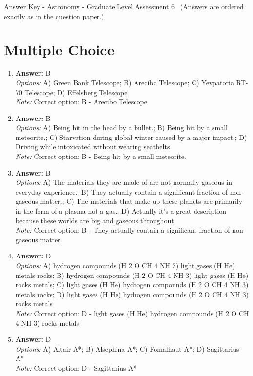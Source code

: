 \documentclass[12pt]{article}
\begin{document}
\begin{center}
Answer Key - Astronomy - Graduate Level Assessment 6 \
\small (Answers are ordered exactly as in the question paper.)
\end{center}

\section*{Multiple Choice}
\begin{enumerate}[label=\arabic*.]
\item \textbf{Answer:} B
\\ \textit{Options:} A) Green Bank Telescope; B) Arecibo Telescope; C) Yevpatoria RT-70 Telescope; D) Effelsberg Telescope
\\ \textit{Note:} Correct option: B - Arecibo Telescope
\item \textbf{Answer:} B
\\ \textit{Options:} A) Being hit in the head by a bullet.; B) Being hit by a small meteorite.; C) Starvation during global winter caused by a major impact.; D) Driving while intoxicated without wearing seatbelts.
\\ \textit{Note:} Correct option: B - Being hit by a small meteorite.
\item \textbf{Answer:} B
\\ \textit{Options:} A) The materials they are made of are not normally gaseous in everyday experience.; B) They actually contain a significant fraction of non-gaseous matter.; C) The materials that make up these planets are primarily in the form of a plasma not a gas.; D) Actually it's a great description because these worlds are big and gaseous throughout.
\\ \textit{Note:} Correct option: B - They actually contain a significant fraction of non-gaseous matter.
\item \textbf{Answer:} D
\\ \textit{Options:} A) hydrogen compounds (H 2 O CH 4 NH 3) light gases (H He) metals rocks; B) hydrogen compounds (H 2 O CH 4 NH 3) light gases (H He) rocks metals; C) light gases (H He) hydrogen compounds (H 2 O CH 4 NH 3) metals rocks; D) light gases (H He) hydrogen compounds (H 2 O CH 4 NH 3) rocks metals
\\ \textit{Note:} Correct option: D - light gases (H He) hydrogen compounds (H 2 O CH 4 NH 3) rocks metals
\item \textbf{Answer:} D
\\ \textit{Options:} A) Altair A*; B) Alsephina A*; C) Fomalhaut A*; D) Sagittarius A*
\\ \textit{Note:} Correct option: D - Sagittarius A*
\end{enumerate}
\end{document}
